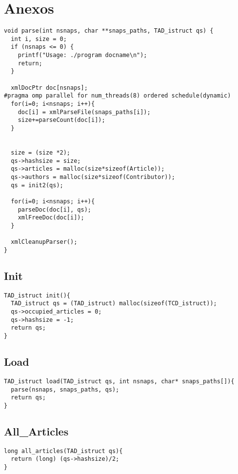 \documentclass{article}
\begin{document}
\newpage

\section{Anexos}

\begin{lstlisting}
void parse(int nsnaps, char **snaps_paths, TAD_istruct qs) {
  int i, size = 0;
  if (nsnaps <= 0) {
    printf("Usage: ./program docname\n");
    return;
  }

  xmlDocPtr doc[nsnaps];
#pragma omp parallel for num_threads(8) ordered schedule(dynamic)
  for(i=0; i<nsnaps; i++){
    doc[i] = xmlParseFile(snaps_paths[i]);
    size+=parseCount(doc[i]);
  }


  size = (size *2);
  qs->hashsize = size;
  qs->articles = malloc(size*sizeof(Article));
  qs->authors = malloc(size*sizeof(Contributor));
  qs = init2(qs);

  for(i=0; i<nsnaps; i++){
    parseDoc(doc[i], qs);
    xmlFreeDoc(doc[i]);
  }

  xmlCleanupParser();
}

\end{lstlisting}

\subsection{Init} \label{Init}

\begin{lstlisting}
TAD_istruct init(){
  TAD_istruct qs = (TAD_istruct) malloc(sizeof(TCD_istruct));
  qs->occupied_articles = 0;
  qs->hashsize = -1;
  return qs;
}
\end{lstlisting}

\subsection{Load} \label{Load}

\begin{lstlisting}
TAD_istruct load(TAD_istruct qs, int nsnaps, char* snaps_paths[]){
  parse(nsnaps, snaps_paths, qs);
  return qs;
}
\end{lstlisting}

\subsection{All\_Articles} \label{All Articles}

\begin{lstlisting}
long all_articles(TAD_istruct qs){
  return (long) (qs->hashsize)/2;
}
\end{lstlisting}
\end{document}
